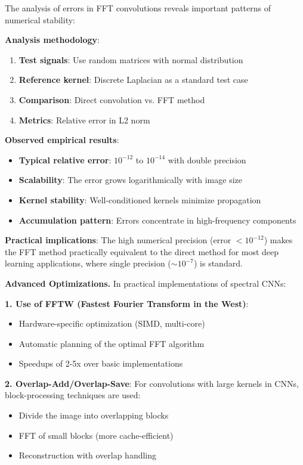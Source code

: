 \begin{example}\label{ex:numerical_error_analysis}
The analysis of errors in \gls{FFT} convolutions reveals important patterns of numerical stability:

\textbf{Analysis methodology}:
\begin{enumerate}
    \item \textbf{Test signals}: Use random matrices with normal distribution
    \item \textbf{Reference kernel}: Discrete Laplacian as a standard test case
    \item \textbf{Comparison}: Direct convolution vs. \gls{FFT} method
    \item \textbf{Metrics}: Relative error in L2 norm
\end{enumerate}

\textbf{Observed empirical results}:
\begin{itemize}
    \item \textbf{Typical relative error}: $10^{-12}$ to $10^{-14}$ with double precision
    \item \textbf{Scalability}: The error grows logarithmically with image size
    \item \textbf{Kernel stability}: Well-conditioned kernels minimize propagation
    \item \textbf{Accumulation pattern}: Errors concentrate in high-frequency components
\end{itemize}

\textbf{Practical implications}:
The high numerical precision (error $< 10^{-12}$) makes the \gls{FFT} method practically equivalent to the direct method for most deep learning applications, where single precision ($\sim 10^{-7}$) is standard.
\end{example}

\textbf{Advanced Optimizations.} In practical implementations of spectral CNNs:

\textbf{1. Use of FFTW (Fastest Fourier Transform in the West)}:
\begin{itemize}
    \item Hardware-specific optimization (SIMD, multi-core)
    \item Automatic planning of the optimal \gls{FFT} algorithm
    \item Speedups of 2-5x over basic implementations
\end{itemize}

\textbf{2. Overlap-Add/Overlap-Save}:
For convolutions with large kernels in CNNs, block-processing techniques are used:
\begin{itemize}
    \item Divide the image into overlapping blocks
    \item FFT of small blocks (more cache-efficient)
    \item Reconstruction with overlap handling
\end{itemize}

